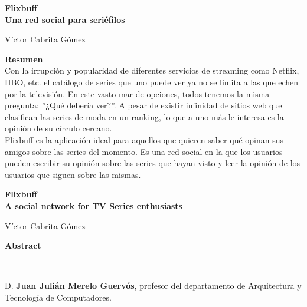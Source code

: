 \thispagestyle{empty}

\begin{center}
{\large\bfseries Flixbuff \\ Una red social para seriéfilos }\\
\end{center}
\begin{center}
Víctor Cabrita Gómez\\
\end{center}

\vspace{0.7cm}

\noindent\textbf{Resumen}\\

Con la irrupción y popularidad de diferentes servicios de streaming como Netflix, HBO, etc. el catálogo de series que uno puede ver ya no se limita a las que echen por la televisión. En este vasto mar de opciones, todos tenemos la misma pregunta: ''¿Qué debería ver?''. A pesar de existir infinidad de sitios web que clasifican las series de moda en un ranking, lo que a uno más le interesa es la opinión de su círculo cercano.\\

Flixbuff es la aplicación ideal para aquellos que quieren saber qué opinan sus amigos sobre las series del momento. Es una red social en la que los usuarios pueden escribir su opinión sobre las series que hayan visto y leer la opinión de los usuarios que siguen sobre las mismas.

\cleardoublepage{}

\begin{center}
	{\large\bfseries Flixbuff \\ A social network for TV Series enthusiasts}\\
\end{center}
\begin{center}
	Víctor Cabrita Gómez\\
\end{center}
\vspace{0.7cm}

\noindent\textbf{Abstract}\\


\cleardoublepage{}

\thispagestyle{empty}

\noindent\rule[-1ex]{\textwidth}{2pt}\\[4.5ex]

D. \textbf{Juan Julián Merelo Guervós}, profesor del departamento de Arquitectura y Tecnología de Computadores.

